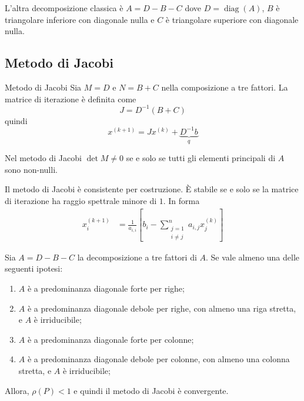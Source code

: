 \documentclass[a4paper]{article}
\begin{document}
L'altra decomposizione classica è \(A=D-B-C\)
dove \(D = \operatorname{diag}(A)\),
\(B\) è triangolare inferiore con diagonale nulla e \(C\) è triangolare superiore con diagonale nulla.

\subsection{Metodo di Jacobi}

\begin{snippetdefinition}{Metodo di Jacobi}
    Sia \(M = D\) e \(N = B+C\) nella composizione a tre fattori.
    La matrice di iterazione è definita come
    \[
        J = D^{-1}(B+C)
    \]
    quindi
    \[
        x^{(k+1)}
        = Jx^{(k)} + \underbrace{D^{-1}b}_q
    \]
\end{snippetdefinition}

Nel metodo di Jacobi \(\det M \neq 0\)
se e solo se tutti gli elementi principali di \(A\) sono
non-nulli.

Il metodo di Jacobi è consistente per costruzione.
È stabile se e solo se la matrice di iterazione ha raggio spettrale minore di \(1\).
In forma
\begin{align*}
    x_i^{(k+1)}
    &= \frac{1}{a_{i,i}}
    \left[
        b_i - \sum_{\substack{j = 1 \\ i \neq j}}^n a_{i,j} x_j^{(k)}
    \right]
\end{align*}

\pagebreak

\begin{snippettheorem}{}
    Sia \(A = D-B-C\) la decomposizione a tre fattori di \(A\).
    Se vale almeno una delle seguenti ipotesi:
    \begin{enumerate}
        \item \(A\) è a predominanza diagonale forte per righe;
        \item \(A\) è a predominanza diagonale debole per righe, con almeno una riga stretta, e \(A\) è irriducibile;
        \item \(A\) è a predominanza diagonale forte per colonne;
        \item \(A\) è a predominanza diagonale debole per colonne, con almeno una colonna stretta, e \(A\) è irriducibile;
    \end{enumerate}
    Allora, \(\rho(P) < 1\) e quindi il metodo di Jacobi è convergente.
\end{snippettheorem}
\end{document}
